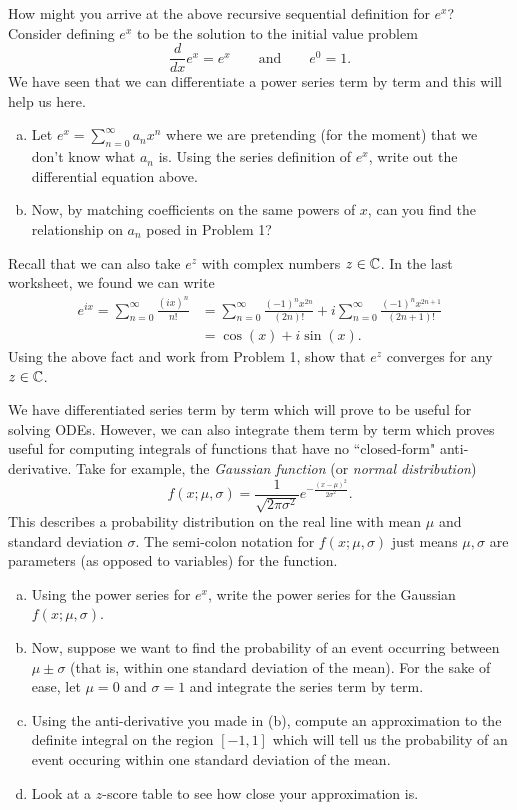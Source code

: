 \documentclass[12pt]{article} %
\begin{document}
\begin{problem}
How might you arrive at the above recursive sequential definition for $e^x$? Consider defining $e^x$ to be the solution to the initial value problem
\[
\frac{d}{dx} e^x = e^x \qquad \textrm{and} \qquad e^0=1.
\]
We have seen that we can differentiate a power series term by term and this will help us here.
\begin{enumerate}[(a)]
    \item Let $e^x = \sum_{n=0}^\infty a_n x^n$ where we are pretending (for the moment) that we don't know what $a_n$ is.  Using the series definition of $e^x$, write out the differential equation above.
    \item Now, by matching coefficients on the same powers of $x$, can you find the relationship on $a_n$ posed in Problem 1?
\end{enumerate}
\end{problem}

\begin{problem}
Recall that we can also take $e^z$ with complex numbers $z\in \mathbb{C}$. In the last worksheet, we found we can write
\begin{align*}
e^{ix} = \sum_{n=0}^\infty \frac{(ix)^n}{n!}&= \sum_{n=0}^\infty \frac{(-1)^n x^{2n}}{(2n)!} + i \sum_{n=0}^\infty \frac{(-1)^n x^{2n+1}}{(2n+1)!}\\
&= \cos(x) + i \sin(x).
\end{align*}
Using the above fact and work from Problem 1, show that $e^z$ converges for any $z\in \mathbb{C}$.
\end{problem}

\begin{problem}
We have differentiated series term by term which will prove to be useful for solving ODEs.  However, we can also integrate them term by term which proves useful for computing integrals of functions that have no ``closed-form" anti-derivative.  Take for example, the \emph{Gaussian function} (or \emph{normal distribution})
\[
f(x;\mu,\sigma)=\frac{1}{\sqrt{2\pi \sigma^2}}e^{-\frac{(x-\mu)^2}{2\sigma^2}}.  
\]
This describes a probability distribution on the real line with mean $\mu$ and standard deviation $\sigma$. The semi-colon notation for $f(x;\mu,\sigma)$ just means $\mu,\sigma$ are parameters (as opposed to variables) for the function.
\begin{enumerate}[(a)]
    \item Using the power series for $e^x$, write the power series for the Gaussian $f(x;\mu,\sigma)$.
    \item Now, suppose we want to find the probability of an event occurring between $\mu \pm \sigma$ (that is, within one standard deviation of the mean).  For the sake of ease, let $\mu=0$ and $\sigma=1$ and integrate the series term by term.
    \item Using the anti-derivative you made in (b), compute an approximation to the definite integral on the region $[-1,1]$ which will tell us the probability of an event occuring within one standard deviation of the mean.
    \item Look at a $z$-score table to see how close your approximation is.
\end{enumerate}
\end{problem}
\end{document}
